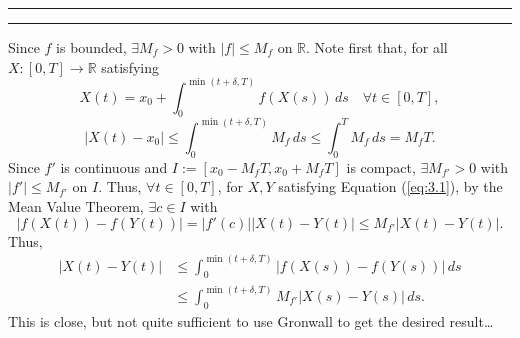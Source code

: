 \documentclass[11pt]{article}
\newcounter{questionCounter}
\newcounter{partCounter}[questionCounter]
\newenvironment{question}[2][\arabic{questionCounter}]{%
    \setcounter{partCounter}{0}%
    \vspace{.25in} \hrule \vspace{0.5em}%
        \noindent{\bf #2}%
    \vspace{0.8em} \hrule \vspace{.10in}%
    \addtocounter{questionCounter}{1}%
}{}
\newcommand{\R}{\mathbb{R}} %
\begin{document}
\begin{question}{Problem 3}
Since $f$ is bounded, $\exists M_f > 0$ with $|f| \leq M_f$ on $\R$.
Note first that, for all $X : [0,T] \rightarrow \R$ satisfying
\begin{equation}
X(t)
 = x_0 + \int_0^{\min(t + \delta, T)} f(X(s)) \, ds
    \quad \forall t \in [0,T],
\label{eq:3.1}
\end{equation}
\[\left| X(t) - x_0 \right|
 \leq \int_0^{\min(t + \delta, T)} M_f \, ds
 \leq \int_0^T M_f \, ds
 = M_f T.
\]
Since $f'$ is continuous and $I := [x_0 - M_f T, x_0 + M_f T]$ is compact,
$\exists M_{f'} > 0$ with $|f'| \leq M_{f'}$ on $I$. Thus,
$\forall t \in [0,T]$, for $X,Y$ satisfying Equation (\ref{eq:3.1}), by the
Mean Value Theorem, $\exists c \in I$ with
\[|f(X(t)) - f(Y(t))| = |f'(c)||X(t) - Y(t)| \leq M_{f'}|X(t) - Y(t)|.\]
Thus,
\begin{align*}
\left| X(t) - Y(t) \right|
 & \leq \int_0^{\min(t + \delta, T)} |f(X(s)) - f(Y(s))| \, ds \\
 & \leq \int_0^{\min(t + \delta, T)} M_{f'}|X(s) - Y(s)| \, ds.
\end{align*}
This is close, but not quite sufficient to use Gronwall to get the desired
result\dots
\end{question}
\end{document}
